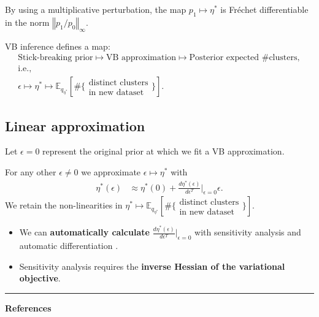 \documentclass[a0,plainsections,30pt]{sciposter}\usepackage[]{graphicx}\usepackage[]{color}
\newcommand{\Expect}{\mathbb{E}}
\newcommand{\etaopt}{\eta^{*}}
\newcommand{\targetexpectation}{\Expect_{q_{\eta^*}}
\left[\#\{\substack{\text{distinct clusters}\\\text{in new dataset}}\} \right]}
\begin{document}
\begin{minipage}[t]{0.45\textwidth}
By using a multiplicative perturbation, the map $p_1 \mapsto \etaopt$ is
Fr\'{e}chet differentiable in the norm $\left\Vert p_1 / p_0
\right\Vert_\infty$.

\begin{mdframed}[style=MyFrame]
VB inference defines a map:
%
\begin{gather*}
\textrm{Stick-breaking prior}
    \mapsto \textrm{VB approximation}
    \mapsto \textrm{Posterior expected \# clusters},\\
\textrm{i.e.,}\\
\epsilon
    \mapsto \etaopt
    \mapsto \targetexpectation.
\end{gather*}
\end{mdframed}


\vspace{-0.9in}
\subsection*{Linear approximation}
\vspace{-0.2in}
Let $\epsilon=0$ represent the original prior at which we fit a VB
approximation.

\begin{mdframed}[style=MyFrame]
For any other $\epsilon \ne 0$ we approximate $\epsilon \mapsto \etaopt$ with
\begin{align*}
\eta^*(\epsilon)  &\approx  \eta^*(0) +
\frac{d \eta^*(\epsilon)}{d\epsilon^T}\Big|_{\epsilon=0} \epsilon.
\label{eq:linear_approx}
\end{align*}
We retain the non-linearities in $\etaopt \mapsto \targetexpectation$.
\end{mdframed}

\begin{itemize}
\item We can \textbf{automatically calculate}
    $\frac{d \eta^*(\epsilon)}{d\epsilon^T}\Big|_{\epsilon=0}$
    with sensitivity analysis and automatic differentiation
    \cite{giordano:2017:covariances, maclaurin:2015:autograd}.
\item Sensitivity analysis requires the
    \textbf{inverse Hessian of the variational objective}.
\end{itemize}

\begin{center}
\noindent\rule{0.6\textwidth}{1pt}
\end{center}
{\bf References}
\renewcommand{\section}[2]{}%
\footnotesize{
  
  
}

\end{minipage}
\end{document}
